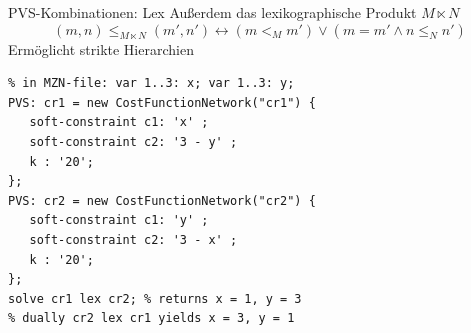 \begin{frame}[fragile]{PVS-Kombinationen: Lex}
Außerdem das \alert{lexikographische} Produkt $M \ltimes N$ 
\[
(m, n) \leq_{M \ltimes N} (m', n') \leftrightarrow (m <_M m') \vee (m = m' \wedge n \leq_N n')
\]
Ermöglicht strikte Hierarchien
\begin{lstlisting}
% in MZN-file: var 1..3: x; var 1..3: y;
PVS: cr1 = new CostFunctionNetwork("cr1") {
   soft-constraint c1: 'x' ;
   soft-constraint c2: '3 - y' ;
   k : '20';
}; 
PVS: cr2 = new CostFunctionNetwork("cr2") {
   soft-constraint c1: 'y' ;
   soft-constraint c2: '3 - x' ;
   k : '20';
};
solve cr1 lex cr2; % returns x = 1, y = 3
% dually cr2 lex cr1 yields x = 3, y = 1 
\end{lstlisting}
\end{frame}
